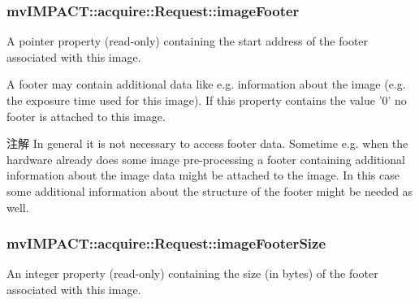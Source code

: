 \hypertarget{classmv_i_m_p_a_c_t_1_1acquire_1_1_request_acb47966e7619eec1fa38befb388a2f39}{
\subsubsection[{image\+Footer}]{ mv\+I\+M\+P\+A\+C\+T\+::acquire\+::\+Request\+::image\+Footer}}\label{classmv_i_m_p_a_c_t_1_1acquire_1_1_request_acb47966e7619eec1fa38befb388a2f39}


A pointer property {\bfseries }(read-\/only) containing the start address of the footer associated with this image. 

A footer may contain additional data like e.\+g. information about the image (e.\+g. the exposure time used for this image). If this property contains the value '0' no footer is attached to this image.

\begin{DoxyNote}{注解}
In general it is not necessary to access footer data. Sometime e.\+g. when the hardware already does some image pre-\/processing a footer containing additional information about the image data might be attached to the image. In this case some additional information about the structure of the footer might be needed as well. 
\end{DoxyNote}
\hypertarget{classmv_i_m_p_a_c_t_1_1acquire_1_1_request_a6d8df3daf87f05fefbad25b7591a2459}{
\subsubsection[{image\+Footer\+Size}]{ mv\+I\+M\+P\+A\+C\+T\+::acquire\+::\+Request\+::image\+Footer\+Size}}\label{classmv_i_m_p_a_c_t_1_1acquire_1_1_request_a6d8df3daf87f05fefbad25b7591a2459}


An integer property {\bfseries }(read-\/only) containing the size (in bytes) of the footer associated with this image. 


